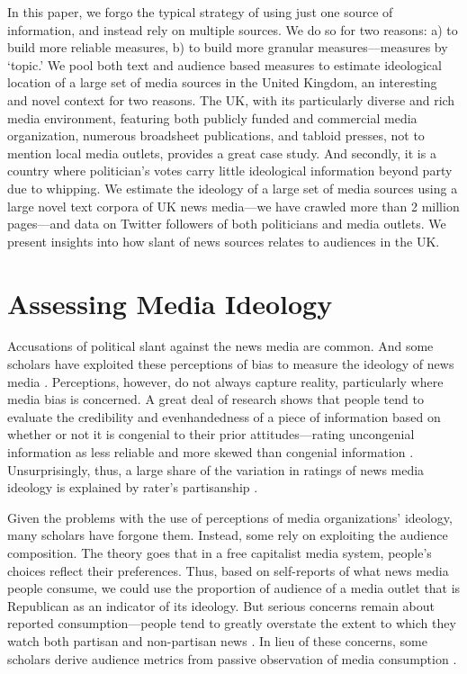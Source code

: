 \documentclass[12pt, letterpaper]{article}
\begin{document}
In this paper, we forgo the typical strategy of using just one source of information, and instead rely on multiple sources. We do so for two reasons: a) to build more reliable measures, b) to build more granular measures---measures by `topic.' We pool both text and audience based measures to estimate ideological location of a large set of media sources in the United Kingdom, an interesting and novel context for two reasons. The UK, with its particularly diverse and rich media environment, featuring both publicly funded and commercial media organization, numerous broadsheet publications, and tabloid presses, not to mention local media outlets, provides a great case study. And secondly, it is a country where politician's votes carry little ideological information beyond party due to whipping. We estimate the ideology of a large set of media sources using a large novel text corpora of UK news media---we have crawled more than 2 million pages---and data on Twitter followers of both politicians and media outlets. We present insights into how slant of news sources relates to audiences in the UK.

\section*{Assessing Media Ideology}

Accusations of political slant against the news media are common. And some scholars have exploited these perceptions of bias to measure the ideology of news media \citep{dilliplane2011all, dilliplane2014activation}. Perceptions, however, do not always capture reality, particularly where media bias is concerned. A great deal of research shows that people tend to evaluate the credibility and evenhandedness of a piece of information based on whether or not it is congenial to their prior attitudes---rating uncongenial information as less reliable and more skewed than congenial information \citep[see, for e.g.,][]{vallone1985hostile, lord1979biased, khanna2015}. Unsurprisingly, thus, a large share of the variation in ratings of news media ideology is explained by rater's partisanship \citep{sood2016}.

Given the problems with the use of perceptions of media organizations' ideology, many scholars have forgone them. Instead, some rely on exploiting the audience composition. The theory goes that in a free capitalist media system, people's choices reflect their preferences. Thus, based on self-reports of what news media people consume, we could use the proportion of audience of a media outlet that is Republican as an indicator of its ideology. But serious concerns remain about reported consumption---people tend to greatly overstate the extent to which they watch both partisan and non-partisan news \citep{prior2013media}. In lieu of these concerns, some scholars derive audience metrics from passive observation of media consumption \citep{flaxman2014}.
\end{document}
